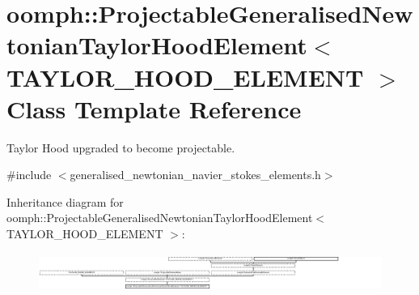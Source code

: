 \hypertarget{classoomph_1_1ProjectableGeneralisedNewtonianTaylorHoodElement}{}\section{oomph\+:\+:Projectable\+Generalised\+Newtonian\+Taylor\+Hood\+Element$<$ T\+A\+Y\+L\+O\+R\+\_\+\+H\+O\+O\+D\+\_\+\+E\+L\+E\+M\+E\+NT $>$ Class Template Reference}
\label{classoomph_1_1ProjectableGeneralisedNewtonianTaylorHoodElement}


Taylor Hood upgraded to become projectable.  




{\ttfamily \#include $<$generalised\+\_\+newtonian\+\_\+navier\+\_\+stokes\+\_\+elements.\+h$>$}

Inheritance diagram for oomph\+:\+:Projectable\+Generalised\+Newtonian\+Taylor\+Hood\+Element$<$ T\+A\+Y\+L\+O\+R\+\_\+\+H\+O\+O\+D\+\_\+\+E\+L\+E\+M\+E\+NT $>$\+:\begin{figure}[H]
\begin{center}
\leavevmode
\includegraphics[height=1.277372cm]{classoomph_1_1ProjectableGeneralisedNewtonianTaylorHoodElement}
\end{center}
\end{figure}
